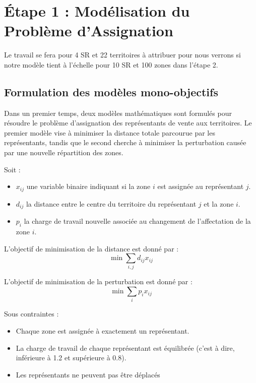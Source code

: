 \section{Étape 1 : Modélisation du Problème d'Assignation}

Le travail se fera pour 4 SR et 22 territoires à attribuer pour nous verrons si notre modèle tient à l'échelle pour 10 SR et 100 zones dans l'étape 2.

\subsection{Formulation des modèles mono-objectifs}
Dans un premier temps, deux modèles mathématiques sont formulés pour résoudre le problème d'assignation des représentants de vente aux territoires. 
Le premier modèle vise à minimiser la distance totale parcourue par les représentants, tandis que le second cherche à minimiser la perturbation causée par une nouvelle répartition des zones.

Soit :
\begin{itemize}
    \item $x_{ij}$ une variable binaire indiquant si la zone $i$ est assignée au représentant $j$.
    \item $d_{ij}$ la distance entre le centre du territoire du représentant $j$ et la zone $i$.
    \item $p_i$ la charge de travail nouvelle associée au changement de l'affectation de la zone $i$.
\end{itemize}

L'objectif de minimisation de la distance est donné par :
\begin{equation}
    \min \sum_{i,j} d_{ij} x_{ij}
\end{equation}

L'objectif de minimisation de la perturbation est donné par :
\begin{equation}
    \min \sum_{i} p_i x_{ij}
\end{equation}

Sous contraintes :
\begin{itemize}
    \item Chaque zone est assignée à exactement un représentant.
    \item La charge de travail de chaque représentant est équilibrée (c'est à dire, inférieure à 1.2 et supérieure à 0.8).
    \item Les représentants ne peuvent pas être déplacés
\end{itemize}

